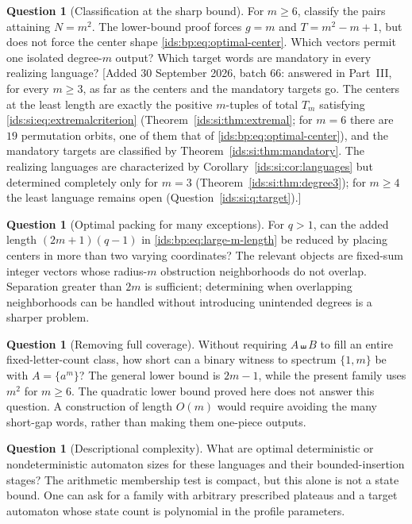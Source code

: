 \documentclass[11pt,letterpaper]{article}
\theoremstyle{definition}\newtheorem{definition}[theorem]{Definition}
\theoremstyle{remark}\newtheorem{remark}[theorem]{Remark}
\theoremstyle{definition}\newtheorem{question}[theorem]{Question}
\newcommand{\sh}{\mathbin{\shuffle}}
\begin{document}
\begin{question}[Classification at the sharp bound]
\label{ids:bp:q:classification}
For $m\geq6$, classify the pairs attaining $N=m^2$. The lower-bound proof
forces $g=m$ and $T=m^2-m+1$, but does not force the center shape
\eqref{ids:bp:eq:optimal-center}. Which vectors permit one isolated degree-$m$
output? Which target words are mandatory in every realizing language?
[Added 30 September 2026, batch 66: answered in Part~III, for every
$m\geq3$, as far as the centers and the mandatory targets go. The centers at
the least length are exactly the positive $m$-tuples of total $T_m$
satisfying \eqref{ids:si:eq:extremalcriterion}
(Theorem~\ref{ids:si:thm:extremal}; for $m=6$ there are $19$ permutation
orbits, one of them that of \eqref{ids:bp:eq:optimal-center}), and the
mandatory targets are classified by Theorem~\ref{ids:si:thm:mandatory}. The
realizing languages are characterized by
Corollary~\ref{ids:si:cor:languages} but determined completely only for
$m=3$ (Theorem~\ref{ids:si:thm:degree3}); for $m\geq4$ the least language
remains open (Question~\ref{ids:si:q:target}).]
\end{question}

\begin{question}[Optimal packing for many exceptions]
\label{ids:bp:q:packing}
For $q>1$, can the added length $(2m+1)(q-1)$ in
\eqref{ids:bp:eq:large-m-length} be reduced by placing centers in more than
two varying coordinates? The relevant objects are fixed-sum integer vectors
whose radius-$m$ obstruction neighborhoods do not overlap. Separation greater
than $2m$ is sufficient; determining when overlapping neighborhoods can be
handled without introducing unintended degrees is a sharper problem.
\end{question}

\begin{question}[Removing full coverage]
\label{ids:bp:q:coverage}
Without requiring $A\sh B$ to fill an entire fixed-letter-count class, how
short can a binary witness to spectrum $\{1,m\}$ be with $A=\{a^m\}$?
The general lower bound is $2m-1$, while the present family uses $m^2$ for
$m\geq6$. The quadratic lower bound proved here does not answer this
question. A construction of length $O(m)$ would require avoiding the many
short-gap words, rather than making them one-piece outputs.
\end{question}

\begin{question}[Descriptional complexity]
\label{ids:bp:q:automata}
What are optimal deterministic or nondeterministic automaton sizes for these
languages and their bounded-insertion stages? The arithmetic membership test
is compact, but this alone is not a state bound. One can ask for a family
with arbitrary prescribed plateaus and a target automaton whose state count
is polynomial in the profile parameters.
\end{question}
\end{document}
